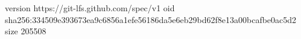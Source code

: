 version https://git-lfs.github.com/spec/v1
oid sha256:334509e393673ea9c6856a1efe56186da5e6eb29bd62f8e13a00bcafbe0ac5d2
size 205508
